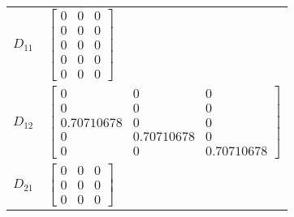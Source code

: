 \begin{tabular}{cl}
 $D_{11}$ & $\left[\begin{matrix}0 & 0 & 0\\0 & 0 & 0\\0 & 0 & 0\\0 & 0 & 0\\0 & 0 & 0\end{matrix}\right]$                                                                                                    \\
 $D_{12}$ & $\left[\begin{matrix}0 & 0 & 0\\0 & 0 & 0\\0.70710678 & 0 & 0\\0 & 0.70710678 & 0\\0 & 0 & 0.70710678\end{matrix}\right]$                                                                         \\
 $D_{21}$ & $\left[\begin{matrix}0 & 0 & 0\\0 & 0 & 0\\0 & 0 & 0\end{matrix}\right]$                                                                                                                          \\
\hline
\end{tabular}
